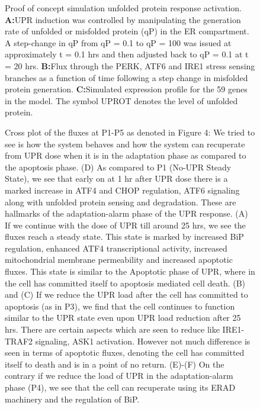 \documentclass[fleqn,10pt]{wlscirep}
\begin{document}
\begin{figure}\centering
{}
	\caption{Proof of concept simulation unfolded protein response activation.
	\textbf{A:}UPR induction was controlled by manipulating the generation rate of unfolded or misfolded protein (qP) in the ER compartment. A step-change in qP from qP = 0.1 to qP = 100 was issued at approximately t = 0.1 hrs and then adjusted back to qP = 0.1 at t = 20 hrs.
	\textbf{B:}Flux through the PERK, ATF6 and IRE1 stress sensing branches as a function of time following a step change in misfolded protein generation.
	\textbf{C:}Simulated expression profile for the 59 genes in the model. The symbol UPROT denotes the level of unfolded protein.}
	\label{fg:proof_of_concept_simulation}
\end{figure}

\begin{figure}\centering
{}
	\caption{Cross plot of the fluxes at P1-P5 as denoted in Figure 4: We tried to see is how the system behaves and how the system can recuperate from UPR dose when it is in the adaptation phase as compared to the apoptosis phase. (D) As compared to P1 (No-UPR Steady State), we see that early on at 1 hr after UPR dose there is a marked increase in ATF4 and CHOP regulation, ATF6 signaling along with unfolded protein sensing and degradation. These are hallmarks of the adaptation-alarm phase of the UPR response. (A) If we continue with the dose of UPR till around 25 hrs, we see the fluxes reach a steady state. This state is marked by increased BiP regulation, enhanced ATF4 transcriptional activity, increased mitochondrial membrane permeability and increased apoptotic fluxes. This state is similar to the Apoptotic phase of UPR, where in the cell has committed itself to apoptosis mediated cell death. (B) and (C) If we reduce the UPR load after the cell has committed to apoptosis (as in P3), we find that the cell continues to function similar to the UPR state even upon UPR load reduction after 25 hrs. There are certain aspects which are seen to reduce like IRE1-TRAF2 signaling, ASK1 activation. However not much difference is seen in terms of apoptotic fluxes, denoting the cell has committed itself to death and is in a point of no return. (E)-(F) On the contrary if we reduce the load of UPR in the adaptation-alarm phase (P4), we see that the cell can recuperate using its ERAD machinery and the regulation of BiP.}
	\label{fg:cross_plot_flux}
\end{figure}
\end{document}
